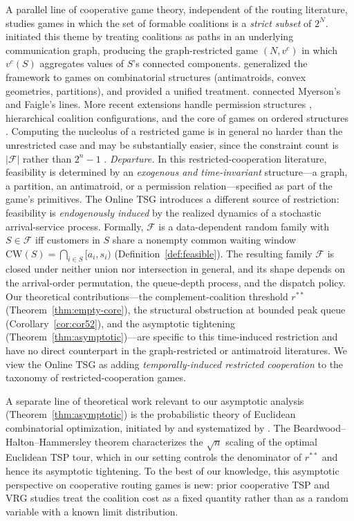 \documentclass[11pt]{article}
\theoremstyle{plain}
\theoremstyle{definition}
\theoremstyle{remark}
\newcommand{\F}{\mathcal{F}}
\newcommand{\CW}{\mathrm{CW}}
\begin{document}
A parallel line of cooperative game theory, independent of the routing literature, studies games in which the set of formable coalitions is a \emph{strict subset} of $2^N$. \citet{myerson1977graphs} initiated this theme by treating coalitions as paths in an underlying communication graph, producing the graph-restricted game $(N, v^{c})$ in which $v^{c}(S)$ aggregates values of $S$'s connected components. \citet{faigle1989cores} generalized the framework to games on combinatorial structures (antimatroids, convex geometries, partitions), and \citet{bilbao2000} provided a unified treatment. \citet{algaba2001unified} connected Myerson's and Faigle's lines. More recent extensions handle permission structures \citep{gilles2010economic}, hierarchical coalition configurations, and the core of games on ordered structures \citep{grabisch2013core}. Computing the nucleolus of a restricted game is in general no harder than the unrestricted case and may be substantially easier, since the constraint count is $|\F|$ rather than $2^n-1$ \citep{schouten2019nucleolus}. \emph{Departure.} In this restricted-cooperation literature, feasibility is determined by an \emph{exogenous and time-invariant} structure---a graph, a partition, an antimatroid, or a permission relation---specified as part of the game's primitives. The Online TSG introduces a different source of restriction: feasibility is \emph{endogenously induced} by the realized dynamics of a stochastic arrival-service process. Formally, $\F$ is a data-dependent random family with $S\in\F$ iff customers in $S$ share a nonempty common waiting window $\CW(S)=\bigcap_{i\in S}[a_i,s_i)$ (Definition~\ref{def:feasible}). The resulting family $\F$ is closed under neither union nor intersection in general, and its shape depends on the arrival-order permutation, the queue-depth process, and the dispatch policy. Our theoretical contributions---the complement-coalition threshold $r^{\ast\ast}$ (Theorem~\ref{thm:empty-core}), the structural obstruction at bounded peak queue (Corollary~\ref{cor:cor52}), and the asymptotic tightening (Theorem~\ref{thm:asymptotic})---are specific to this time-induced restriction and have no direct counterpart in the graph-restricted or antimatroid literatures. We view the Online TSG as adding \emph{temporally-induced restricted cooperation} to the taxonomy of restricted-cooperation games.

A separate line of theoretical work relevant to our asymptotic analysis (Theorem~\ref{thm:asymptotic}) is the probabilistic theory of Euclidean combinatorial optimization, initiated by \citet{beardwood1959shortest} and systematized by \citet{steele1981subadditive,steele1997probability}. The Beardwood--Halton--Hammersley theorem characterizes the $\sqrt{n}$ scaling of the optimal Euclidean TSP tour, which in our setting controls the denominator of $r^{\ast\ast}$ and hence its asymptotic tightening. To the best of our knowledge, this asymptotic perspective on cooperative routing games is new: prior cooperative TSP and VRG studies \citep{potters1992tsg,gothe1996vrg,engevall2004heterogeneous,kimms2016core} treat the coalition cost as a fixed quantity rather than as a random variable with a known limit distribution.
\end{document}
